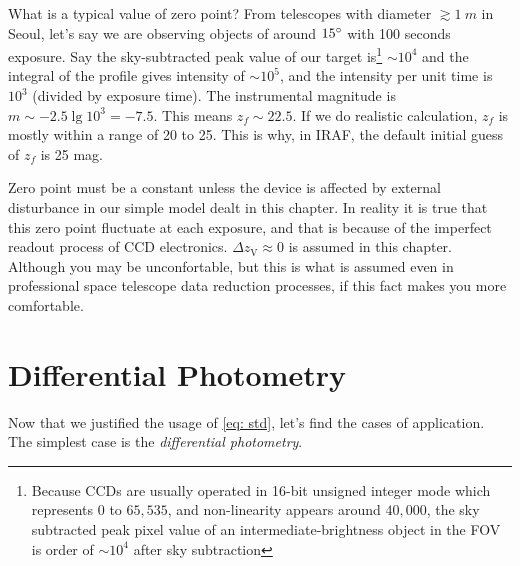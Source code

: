 
What is a typical value of zero point? From telescopes with diameter $ \gtrsim \SI{1}{m} $ in Seoul, let's say we are observing objects of around $ \m{15} $ with 100 seconds exposure. Say the sky-subtracted peak value of our target is\footnote{Because CCDs are usually operated in 16-bit unsigned integer mode which represents $ 0 $ to $ 65,535 $, and non-linearity appears around $ 40,000 $, the sky subtracted peak pixel value of an intermediate-brightness object in the FOV is order of $ \sim 10^4 $ after sky subtraction} $ \sim 10^4 $ and the integral of the profile gives intensity of $ \sim 10^{5} $, and the intensity per unit time is $ 10^3 $ (divided by exposure time). The instrumental magnitude is $ m \sim -2.5 \lg 10^3 = -7.5 $. This means $ z_f \sim 22.5 $. If we do realistic calculation, $ z_f $ is mostly within a range of 20 to 25. This is why, in IRAF, the default initial guess of $ z_f $ is 25 mag.

Zero point must be a constant unless the device is affected by external disturbance in our simple model dealt in this chapter. In reality it is true that this zero point fluctuate at each exposure, and that is because of the imperfect readout process of CCD electronics. $ \Delta z_\mathrm{V} \approx 0 $ is assumed in this chapter. Although you may be unconfortable, but this is what is assumed even in professional space telescope data reduction processes, if this fact makes you more comfortable.

\section{Differential Photometry}
Now that we justified the usage of \cref{eq: std}, let's find the cases of application. The simplest case is the \textit{differential photometry}. 


